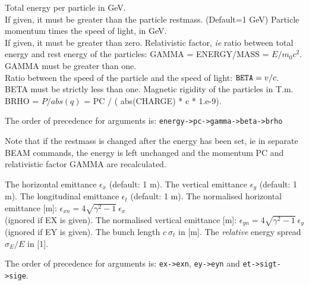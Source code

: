 \begin{madlist}
   \label{beam_energy} Total energy per particle in
  GeV.\\ If given, it must be greater than the particle
  restmass. (Default=1 GeV)
   Particle momentum times the speed of light, in GeV. \\
  If given, it must be greater than zero. 
   Relativistic factor, {\sl ie} ratio between total
  energy and rest energy of the particles: GAMMA = ENERGY/MASS = $E / m_0 c^2$. \\
  GAMMA must be greater than one.\\ 
   Ratio between the speed of the particle
  and the speed of light: ${\tt BETA} = v / c$.\\
  BETA must be strictly less than one.
   Magnetic rigidity of the particles in T.m. \\ 
  BRHO = $P / abs(q)$ = PC / ( abs(CHARGE) * c * 1.e-9). 
\end{madlist}  
The order of precedence for arguments is: {\tt energy->pc->gamma->beta->brho}

Note that if the restmass is changed after the energy has been set, ie
in separate BEAM commands, the energy is left unchanged and the momentum
PC and relativistic factor GAMMA are recalculated. 
\\

\begin{madlist}
   The horizontal emittance $\epsilon_x$ (default: 1 m). 
   The vertical emittance $\epsilon_y$ (default: 1 m). 
   The longitudinal emittance $\epsilon_t$ (default: 1 m). 
   The normalised horizontal emittance [m]:
  $\epsilon_{xn} = 4 \sqrt{\gamma^2 - 1} \ \epsilon_x$ \\ 
  (ignored if EX is given).  
   The normalised vertical emittance [m]:
  $\epsilon_{yn} = 4 \sqrt{\gamma^2 - 1} \ \epsilon_y$ \\ 
  (ignored if EY is given).  
   The bunch length $c\ \sigma_t$ in [m].  
   The \emph{relative} energy spread
  $\sigma_E / E$ in [1].  
\end{madlist} 

The order of precedence for arguments is: {\tt ex->exn}, {\tt ey->eyn} and
{\tt et->sigt->sige}.


